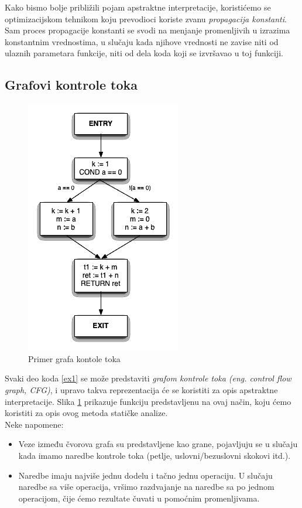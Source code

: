 Kako bismo bolje približili pojam apstraktne interpretacije, koristićemo se
optimizacijskom tehnikom koju prevodioci koriste zvanu \emph{propagacija konstanti}.
Sam proces propagacije konstanti se svodi na menjanje promenljivih u izrazima
konstantnim vrednostima, u slučaju kada njihove vrednosti ne zavise niti od
ulaznih parametara funkcije, niti od dela koda koji se izvršavao u toj funkciji.


\subsection{Grafovi kontrole toka}
\label{subsec:cfgs}

\begin{figure}[H]
\begin{center}
\includegraphics[scale=0.5]{Treehydra-cfg.png}
\end{center}
\caption{Primer grafa kontole toka}
\label{fig:graf}
\end{figure}

Svaki deo koda \ref{ex1} se može predstaviti \emph{grafom kontrole toka (eng. control flow graph, CFG)},
i upravo takva reprezentacija će se koristiti za opis apstraktne interpretacije.
Slika \ref{fig:graf} prikazuje funkciju predstavljenu na ovaj način, koju ćemo koristiti za
opis ovog metoda statičke analize.\\
Neke napomene:
\begin{itemize}
\item Veze između čvorova grafa su predstavljene kao grane, pojavljuju se u slučaju
kada imamo naredbe kontrole toka (petlje, uslovni/bezuslovni skokovi itd.).
\item Naredbe imaju najviše jednu dodelu i tačno jednu operaciju. U slučaju naredbe
sa više operacija, vršimo razdvajanje na naredbe sa po jednom operacijom, čije
ćemo rezultate čuvati u pomoćnim promenljivama.
\end{itemize}

